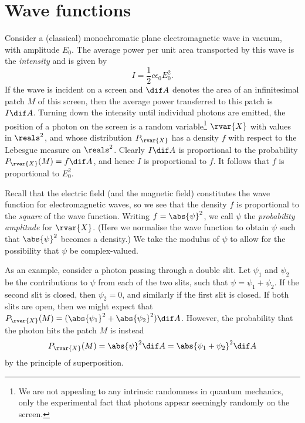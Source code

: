 \documentclass[article, a4paper, 11pt, oneside]{memoir}
\title{\doctitle}
\author{\docauthor}
\numberwithin{equation}{chapter}
\begin{document}
\maketitle

\chapter{Wave functions}

Consider a (classical) monochromatic plane electromagnetic wave in vacuum, with amplitude $E_0$. The average power per unit area transported by this wave is the \emph{intensity} and is given by
%
\begin{equation*}
    I
        = \frac{1}{2} c \epsilon_0 E_0^2.
\end{equation*}
%
If the wave is incident on a screen and $\dif A$ denotes the area of an infinitesimal patch $M$ of this screen, then the average power transferred to this patch is $I \dif A$. Turning down the intensity until individual photons are emitted, the position of a photon on the screen is a random variable\footnote{We are not appealing to any intrinsic randomness in quantum mechanics, only the experimental fact that photons appear seemingly randomly on the screen.} $\rvar{X}$ with values in $\reals^2$, and whose distribution $P_\rvar{X}$ has a density $f$ with respect to the Lebesgue measure on $\reals^2$. Clearly $I \dif A$ is proportional to the probability $P_\rvar{X}(M) = f \dif A$, and hence $I$ is proportional to $f$. It follows that $f$ is proportional to $E_0^2$.

Recall that the electric field (and the magnetic field) constitutes the wave function for electromagnetic waves, so we see that the density $f$ is proportional to the \emph{square} of the wave function. Writing $f = \abs{\psi}^2$, we call $\psi$ the \emph{probability amplitude} for $\rvar{X}$. (Here we normalise the wave function to obtain $\psi$ such that $\abs{\psi}^2$ becomes a density.) We take the modulus of $\psi$ to allow for the possibility that $\psi$ be complex-valued.

As an example, consider a photon passing through a double slit. Let $\psi_1$ and $\psi_2$ be the contributions to $\psi$ from each of the two slits, such that $\psi = \psi_1 + \psi_2$. If the second slit is closed, then $\psi_2 = 0$, and similarly if the first slit is closed. If both slits are open, then we might expect that $P_\rvar{X}(M) = (\abs{\psi_1}^2 + \abs{\psi_2}^2) \dif A$. However, the probability that the photon hits the patch $M$ is instead 
%
\begin{equation*}
    P_\rvar{X}(M)
        = \abs{\psi}^2 \dif A
        = \abs{\psi_1 + \psi_2}^2 \dif A
\end{equation*}
%
by the principle of superposition.
\end{document}
